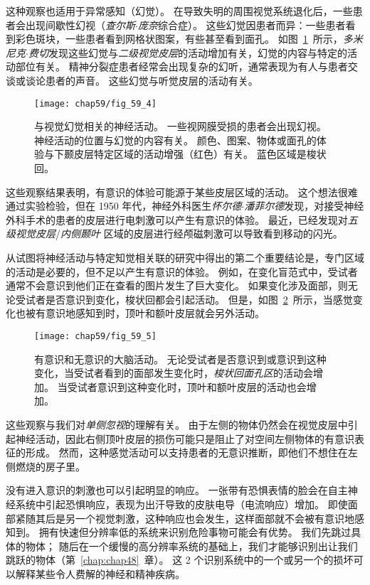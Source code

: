 这种观察也适用于异常感知（幻觉）。
在导致失明的周围视觉系统退化后，一些患者会出现间歇性幻视（\textit{查尔斯$\cdot$庞奈}综合症）。
这些幻觉因患者而异：一些患者看到彩色斑块，一些患者看到网格状图案，有些甚至看到面孔。
如图~\ref{fig:59_4}~所示，\textit{多米尼克$\cdot$费切}发现这些幻觉与\textit{二级视觉皮层}的活动增加有关，幻觉的内容与特定的活动部位有关。
精神分裂症患者经常会出现复杂的幻听，通常表现为有人与患者交谈或谈论患者的声音。
这些幻觉与听觉皮层的活动有关。


\begin{figure}[htbp]
	\centering
	\texttt{[image: chap59/fig\_59\_4]}
	\caption{与视觉幻觉相关的神经活动。
		一些视网膜受损的患者会出现幻视。
		神经活动的位置与幻觉的内容有关。
		颜色、图案、物体或面孔的体验与下颞皮层特定区域的活动增强（红色）有关。
		蓝色区域是梭状回\cite{howard1998anatomy}。}
	\label{fig:59_4}
\end{figure}


这些观察结果表明，有意识的体验可能源于某些皮层区域的活动。
这个想法很难通过实验检验，但在 1950 年代，神经外科医生\textit{怀尔德$\cdot$潘菲尔德}发现，对接受神经外科手术的患者的皮层进行电刺激可以产生有意识的体验。
最近，已经发现对\textit{五级视觉皮层}/\textit{内侧颞叶} 区域的皮层进行经颅磁刺激可以导致看到移动的闪光。


从试图将神经活动与特定知觉相关联的研究中得出的第二个重要结论是，专门区域的活动是必要的，但不足以产生有意识的体验。
例如，在变化盲范式中，受试者通常不会意识到他们正在查看的图片发生了巨大变化。
如果变化涉及面部，则无论受试者是否意识到变化，梭状回都会引起活动。
但是，如图~\ref{fig:59_5}~所示，当感觉变化也被有意识地感知到时，顶叶和额叶皮层就会另外活动。


\begin{figure}[htbp]
	\centering
	\texttt{[image: chap59/fig\_59\_5]}
	\caption{有意识和无意识的大脑活动。
		无论受试者是否意识到或意识到这种变化，当受试者看到的面部发生变化时，\textit{梭状回面孔区}的活动会增加。
		当受试者意识到这种变化时，顶叶和额叶皮层的活动也会增加\cite{beck2001neural}。}
	\label{fig:59_5}
\end{figure}


这些观察与我们对\textit{单侧忽视}的理解有关。
由于左侧的物体仍然会在视觉皮层中引起神经活动，因此右侧顶叶皮层的损伤可能只是阻止了对空间左侧物体的有意识表征的形成。
然而，这种感觉活动可以支持患者的无意识推断，即他们不想住在左侧燃烧的房子里。


没有进入意识的刺激也可以引起明显的响应。
一张带有恐惧表情的脸会在自主神经系统中引起恐惧响应，表现为出汗导致的皮肤电导（电流响应）增加。
即使面部紧随其后是另一个视觉刺激，这种响应也会发生，这样面部就不会被有意识地感知到。
拥有快速但分辨率低的系统来识别危险事物可能会有优势。
我们先跳过具体的物体；
随后在一个缓慢的高分辨率系统的基础上，我们才能够识别出让我们跳跃的物体（第~\ref{chap:chap48}~章）。
这 2 个识别系统中的一个或另一个的损坏可以解释某些令人费解的神经和精神疾病。


